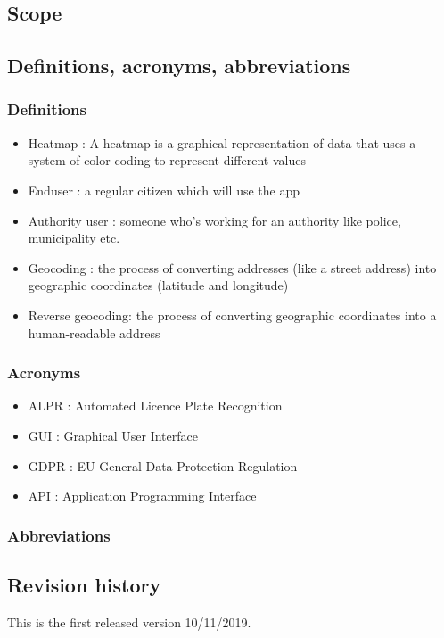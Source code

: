 \subsection{Scope}




\subsection{Definitions,  acronyms,  abbreviations}

\subsubsection{Definitions}
\begin{itemize}
  \item{Heatmap} : A heatmap is a graphical representation of data that uses a system of color-coding to represent different values
  \item Enduser : a regular citizen which will use the app
  \item Authority user : someone who's working for an authority like police, municipality etc.
  \item Geocoding : the process of converting addresses (like a street address) into geographic coordinates (latitude and longitude)
  \item Reverse geocoding:  the process of converting geographic coordinates into a human-readable address

\end{itemize}

\subsubsection{Acronyms}
\begin{itemize}
  \item ALPR : Automated Licence Plate Recognition
  \item GUI : Graphical User Interface
  \item GDPR : EU General Data Protection Regulation
  \item API : Application Programming Interface
\end{itemize}

\subsubsection{Abbreviations}


\subsection{Revision history}
This is the first released version 10/11/2019.

